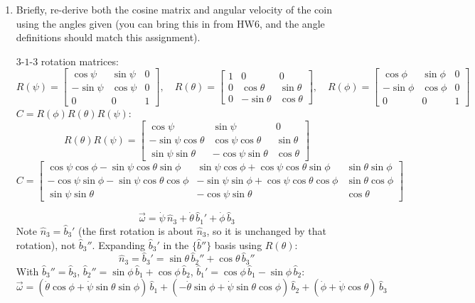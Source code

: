 \documentclass[11pt]{article}
\begin{document}
\begin{enumerate}[label=(\alph*)]
    \item Briefly, re-derive both the cosine matrix and angular velocity of the coin using the angles given (you can bring this in from HW6, and the angle definitions should match this assignment).

    $3$-$1$-$3$ rotation matrices:
    $$R(\psi)=\begin{bmatrix}\cos\psi&\sin\psi&0\\-\sin\psi&\cos\psi&0\\0&0&1\end{bmatrix}, \quad R(\theta)=\begin{bmatrix}1&0&0\\0&\cos\theta&\sin\theta\\0&-\sin\theta&\cos\theta\end{bmatrix}, \quad R(\phi)=\begin{bmatrix}\cos\phi&\sin\phi&0\\-\sin\phi&\cos\phi&0\\0&0&1\end{bmatrix}$$
    $C=R(\phi)R(\theta)R(\psi)$:
    $$R(\theta)R(\psi)=\begin{bmatrix}\cos\psi & \sin\psi & 0\\-\sin\psi\cos\theta & \cos\psi\cos\theta & \sin\theta\\\sin\psi\sin\theta & -\cos\psi\sin\theta & \cos\theta\end{bmatrix}$$
    $$\boxed{C=\begin{bmatrix}
    \cos\psi\cos\phi-\sin\psi\cos\theta\sin\phi & \sin\psi\cos\phi+\cos\psi\cos\theta\sin\phi & \sin\theta\sin\phi\\[4pt]
    -\cos\psi\sin\phi-\sin\psi\cos\theta\cos\phi & -\sin\psi\sin\phi+\cos\psi\cos\theta\cos\phi & \sin\theta\cos\phi\\[4pt]
    \sin\psi\sin\theta & -\cos\psi\sin\theta & \cos\theta
    \end{bmatrix}}$$

    $$\vec\omega = \dot\psi\,\hat n_3+\dot\theta\,\hat b_1'+\dot\phi\,\hat b_3$$
    Note $\hat n_3=\hat b_3'$ (the first rotation is about $\hat n_3$, so it is unchanged by that rotation), not $\hat b_3''$. Expanding $\hat b_3'$ in the $\{\hat b''\}$ basis using $R(\theta)$:
    $$\hat n_3 = \hat b_3' = \sin\theta\,\hat b_2''+\cos\theta\,\hat b_3''$$
    With $\hat b_3''=\hat b_3$, $\hat b_2''=\sin\phi\,\hat b_1+\cos\phi\,\hat b_2$, $\hat b_1'=\cos\phi\,\hat b_1-\sin\phi\,\hat b_2$:
    $$\boxed{\vec\omega = (\dot\theta\cos\phi+\dot\psi\sin\theta\sin\phi)\,\hat b_1+(-\dot\theta\sin\phi+\dot\psi\sin\theta\cos\phi)\,\hat b_2+(\dot\phi+\dot\psi\cos\theta)\,\hat b_3}$$


\end{enumerate}
\end{document}
